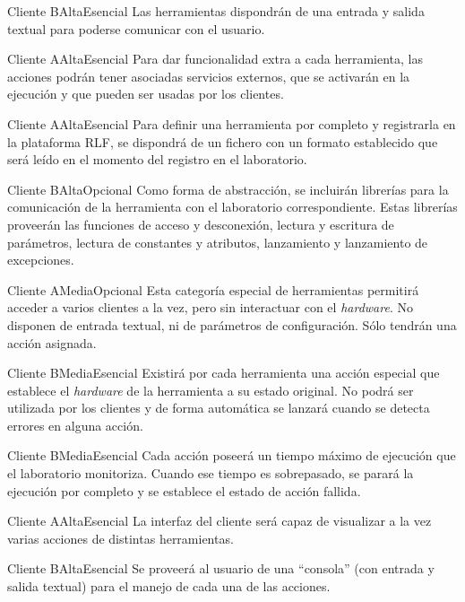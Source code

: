 {Cliente B}{Alta}{Esencial}
{
Las herramientas dispondrán de una entrada y salida textual para poderse 
comunicar con el usuario.
}

{Cliente A}{Alta}{Esencial}
{
Para dar funcionalidad extra a cada herramienta, las acciones podrán 
tener asociadas servicios externos, que se activarán en la ejecución y 
que pueden ser usadas por los clientes.
}

{Cliente A}{Alta}{Esencial}
{
Para definir una herramienta por completo y registrarla en la 
plataforma RLF, se dispondrá de un fichero con un formato establecido 
que será leído en el momento del registro en el laboratorio.
}

{Cliente B}{Alta}{Opcional}
{
Como forma de abstracción, se incluirán
librerías para la comunicación de la herramienta con el laboratorio 
correspondiente. Estas librerías proveerán las funciones de acceso y 
desconexión, lectura y escritura de parámetros, lectura de constantes 
y atributos, lanzamiento y lanzamiento de excepciones.
}

{Cliente A}{Media}{Opcional}
{
Esta categoría especial de herramientas permitirá acceder a varios 
clientes a la vez, pero sin interactuar con el \emph{hardware}. No 
disponen de entrada textual, ni de parámetros de configuración. Sólo 
tendrán una acción asignada.
}

{Cliente B}{Media}{Esencial}
{
Existirá por cada herramienta una acción especial que establece el 
\emph{hardware} de la herramienta a su estado original. No podrá ser 
utilizada por los clientes y de forma automática se lanzará cuando se 
detecta errores en alguna acción.
}

{Cliente B}{Media}{Esencial}
{
Cada acción poseerá un tiempo máximo de ejecución que el laboratorio 
monitoriza. Cuando ese tiempo es sobrepasado, se parará la ejecución por 
completo y se establece el estado de acción fallida.
}

{Cliente A}{Alta}{Esencial}
{
La interfaz del cliente será capaz de visualizar a la vez varias 
acciones de distintas herramientas.
}

{Cliente B}{Alta}{Esencial}
{
Se proveerá al usuario de una ``consola'' (con entrada y salida textual) 
para el manejo de cada una de las acciones.
}

